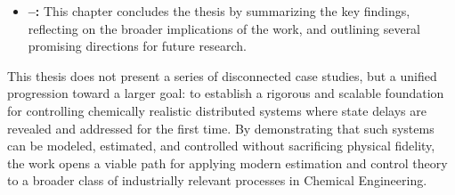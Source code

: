 \begin{itemize}
    \item \textbf{--:} This chapter concludes the thesis by summarizing the key findings, reflecting on the broader implications of the work, and outlining several promising directions for future research.%
\end{itemize}

This thesis does not present a series of disconnected case studies, but a unified progression toward a larger goal: to establish a rigorous and scalable foundation for controlling chemically realistic distributed systems where state delays are revealed and addressed for the first time. By demonstrating that such systems can be modeled, estimated, and controlled without sacrificing physical fidelity, the work opens a viable path for applying modern estimation and control theory to a broader class of industrially relevant processes in Chemical Engineering.